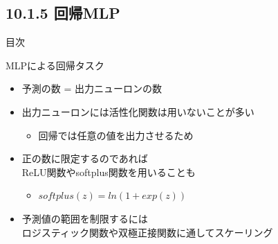 \documentclass[aspectratio=169, dvipdfmx, 14pt, xcolor={svgnames,dvipsnames}]{beamer}
\def\tightlist{\itemsep1pt\parskip0pt\parsep0pt}
\begin{document}

\hypertarget{ux56deux5e30mlp}{%
  \subsection{10.1.5 回帰MLP}\label{ux56deux5e30mlp}}
\begin{frame}{\quad 目次}
  \tableofcontents[currentsubsection]
\end{frame}


\begin{frame}{\quad MLPによる回帰タスク}
  \begin{itemize}
    \item
          予測の数 = 出力ニューロンの数
    \item
          出力ニューロンには活性化関数は用いないことが多い

          \begin{itemize}
            \tightlist
            \item
                  回帰では任意の値を出力させるため
          \end{itemize}
    \item
          正の数に限定するのであれば\\ReLU関数やsoftplus関数を用いることも

          \begin{itemize}
            \tightlist
            \item
                  $softplus(z) = ln(1 + exp(z))$
          \end{itemize}
    \item
          予測値の範囲を制限するには\\ロジスティック関数や双極正接関数に通してスケーリング
  \end{itemize}
\end{frame}

\end{document}
